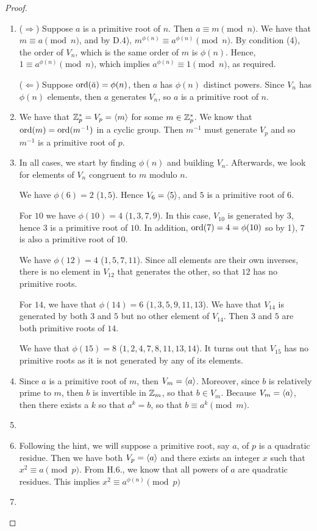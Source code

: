 \begin{proof}
 \begin{enumerate}
     \item ($\Rightarrow$) Suppose $a$ is a primitive root of $n$. Then $a\equiv m\pmod{n}$. We have that $m\equiv a\pmod{n}$, and by D.4), $m^{\phi(n)}\equiv a^{\phi(n)}\pmod{n}$. By condition (4), the order of $V_{n}$, which is the same order of $m$ is $\phi(n)$. Hence, $1\equiv a^{\phi(n)}\pmod{n}$, which implies $a^{\phi(n)}\equiv 1\pmod{n}$, as required.

     ($\Leftarrow$) Suppose $\operatorname*{ord}(\bar{a})=\phi(n)$, then $a$ has $\phi(n)$ distinct powers. Since $V_n$ has $\phi(n)$ elements, then $a$ generates $V_n$, so $a$ is a primitive root of $n$. 
     \item We have that $\mathbb{Z}^{*}_{p}= V_p= \left\langle m\right\rangle$ for some $m\in\mathbb{Z}^{*}_{p}$. We know that $\operatorname*{ord}(m)=\operatorname*{ord}(m^{-1})$ in a cyclic group. Then $m^{-1}$ must generate $V_p$ and so $m^{-1}$ is a primitive root of $p$.
     \item In all cases, we start by finding $\phi(n)$ and building $V_n$. Afterwards, we look for elements of $V_n$ congruent to $m$ modulo $n$.

     We have $\phi(6)=2$ ($1,5$). Hence $V_6 =\left\langle 5\right\rangle$, and $5$ is a primitive root of $6$.

     For $10$ we have $\phi(10)=4$ ($1,3,7,9$). In this case, $V_{10}$ is generated by $3$, hence $3$ is a primitive root of $10$. In addition, $\operatorname*{ord}(7)=4=\phi(10)$ so by 1), $7$ is also a primitive root of $10$.

     We have $\phi(12)=4$ ($1,5,7,11$). Since all elements are their own inverses, there is no element in $V_{12}$ that generates the other, so that $12$ has no primitive roots.

     For $14$, we have that $\phi(14)=6$ ($1,3,5,9,11,13$). We have that $V_{14}$ is generated by both $3$ and $5$ but no other element of $V_{14}$. Then $3$ and $5$ are both primitive roots of $14$.

     We have that $\phi(15)=8$ ($1,2,4,7,8,11,13,14$). It turns out that $V_{15}$ has no primitive roots as it is not generated by any of its elements.
     \item Since $a$ is a primitive root of $m$, then $V_m =\left\langle a\right\rangle$. Moreover, since $b$ is relatively prime to $m$, then $b$ is invertible in $\mathbb{Z}_m$, so that $b\in V_m$. Because $V_m =\left\langle a\right\rangle$, then there exists a $k$ so that $a^{k}=b$, so that $b\equiv a^{k}\pmod{m}$.
     \item 
     \item Following the hint, we will suppose a primitive root, say $a$, of $p$ is a quadratic residue. Then we have both $V_p =\left\langle a\right\rangle$ and there exists an integer $x$ such that $x^2 \equiv a\pmod{p}$. From H.6., we know that all powers of $a$ are quadratic residues. This implies $x^2 \equiv a^{\phi(n)}\pmod{p}$
     \item 
 \end{enumerate}
\end{proof}
